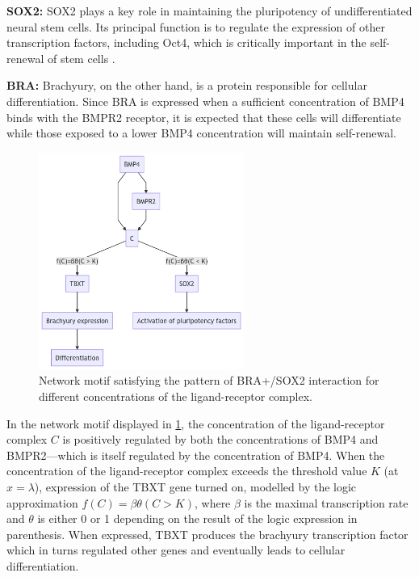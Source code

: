 \documentclass{article} %
\begin{document}
\begin{enumerate}
    \textbf{SOX2:}
    SOX2 plays a key role in maintaining the pluripotency of undifferentiated neural stem cells. Its principal function is to regulate the expression of other transcription factors, including Oct4, which is critically important in the self-renewal of stem cells \parencite{chambers2009transcriptional}.

    \textbf{BRA:} Brachyury, on the other hand, is a protein responsible for cellular differentiation. Since BRA is expressed when a sufficient concentration of BMP4 binds with the BMPR2 receptor, it is expected that these cells will differentiate while those exposed to a lower BMP4 concentration will maintain self-renewal.

    \begin{figure}[htpb]
      \centering
      \includegraphics[width=0.6\textwidth]{motif}
      \caption{Network motif satisfying the pattern of BRA+/SOX2 interaction for different concentrations of the ligand-receptor complex.}
      \label{fig:motif}
    \end{figure} 

    In the network motif displayed in \ref{fig:motif}, the concentration of the ligand-receptor complex $C$ is positively regulated by both the concentrations of BMP4 and BMPR2---which is itself regulated by the concentration of BMP4. When the concentration of the ligand-receptor complex exceeds the threshold value $K$ (at $x=\lambda$), expression of the TBXT gene turned on, modelled by the logic approximation $f(C)=\beta \theta (C > K)$, where $\beta$ is the maximal transcription rate and $\theta$ is either 0 or 1 depending on the result of the logic expression in parenthesis. When expressed, TBXT produces the brachyury transcription factor which in turns regulated other genes and eventually leads to cellular differentiation.


\end{enumerate}
\end{document}

